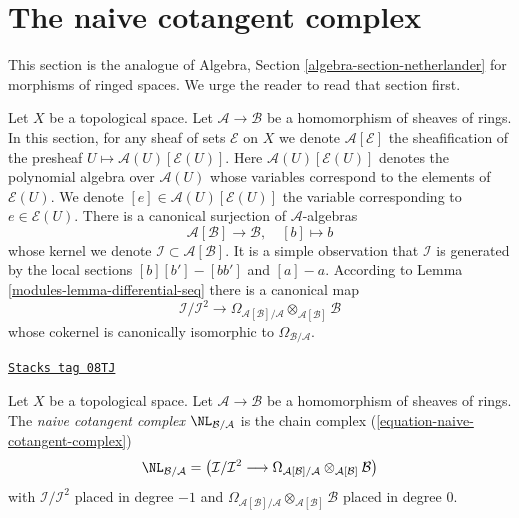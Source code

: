 \section{The naive cotangent complex}
\label{modules-section-netherlander}
This section is the analogue of
Algebra, Section \ref{algebra-section-netherlander} for morphisms of ringed
spaces. We urge the reader to read that section first.

\medskip\noindent
Let $X$ be a topological space. Let $\mathcal{A} \to \mathcal{B}$ be a
homomorphism of sheaves of rings. In this section, for any sheaf of sets
$\mathcal{E}$ on $X$ we denote $\mathcal{A}[\mathcal{E}]$ the sheafification
of the presheaf $U \mapsto \mathcal{A}(U)[\mathcal{E}(U)]$. Here
$\mathcal{A}(U)[\mathcal{E}(U)]$
denotes the polynomial algebra over $\mathcal{A}(U)$
whose variables correspond to the elements of $\mathcal{E}(U)$.
We denote $[e] \in \mathcal{A}(U)[\mathcal{E}(U)]$ the variable
corresponding to $e \in \mathcal{E}(U)$.
There is a canonical surjection of $\mathcal{A}$-algebras
\begin{equation}
\label{equation-canonical-presentation}
\mathcal{A}[\mathcal{B}] \longrightarrow \mathcal{B},\quad [b] \longmapsto b
\end{equation}
whose kernel we denote $\mathcal{I} \subset \mathcal{A}[\mathcal{B}]$.
It is a simple observation that $\mathcal{I}$ is generated by the
local sections $[b][b'] - [bb']$ and $[a] - a$. According to
Lemma \ref{modules-lemma-differential-seq} there is a canonical map
\begin{equation}
\label{equation-naive-cotangent-complex}
\mathcal{I}/\mathcal{I}^2
\longrightarrow
\Omega_{\mathcal{A}[\mathcal{B}]/\mathcal{A}}
\otimes_{\mathcal{A}[\mathcal{B}]} \mathcal{B}
\end{equation}
whose cokernel is canonically isomorphic to $\Omega_{\mathcal{B}/\mathcal{A}}$.

\begin{definition}
\label{modules-definition-naive-cotangent-complex}
\href{https://stacks.math.columbia.edu/tag/08TJ}{\texttt{Stacks tag 08TJ}}

Let $X$ be a topological space. Let $\mathcal{A} \to \mathcal{B}$ be a
homomorphism of sheaves of rings. The {\it naive cotangent complex}
$\NL_{\mathcal{B}/\mathcal{A}}$ is the chain complex
(\ref{equation-naive-cotangent-complex})
$$
\NL_{\mathcal{B}/\mathcal{A}} =
\left(\mathcal{I}/\mathcal{I}^2
\longrightarrow
\Omega_{\mathcal{A}[\mathcal{B}]/\mathcal{A}}
\otimes_{\mathcal{A}[\mathcal{B}]} \mathcal{B}\right)
$$
with $\mathcal{I}/\mathcal{I}^2$ placed in degree $-1$ and
$\Omega_{\mathcal{A}[\mathcal{B}]/\mathcal{A}}
\otimes_{\mathcal{A}[\mathcal{B}]} \mathcal{B}$
placed in degree $0$.
\end{definition}

